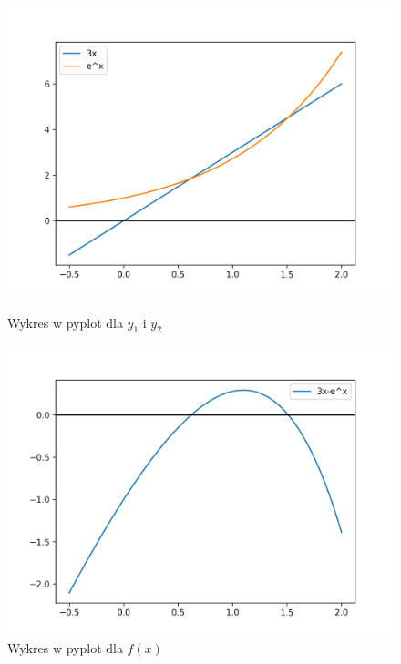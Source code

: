 \documentclass[12pt]{article}
\begin{document}
\begin{figure}[!h]
  \includegraphics[width=\linewidth]{zad5_a_plot.png}
  \caption{Wykres w pyplot dla $y_1$ i $y_2$}\label{fig:figure1}
\endminipage\hfill
{}
  \includegraphics[width=\linewidth]{zad5_b_plot.png}
  \caption{Wykres w pyplot dla $f(x)$}\label{fig:figure2}
\endminipage
\end{figure}
\end{document}
